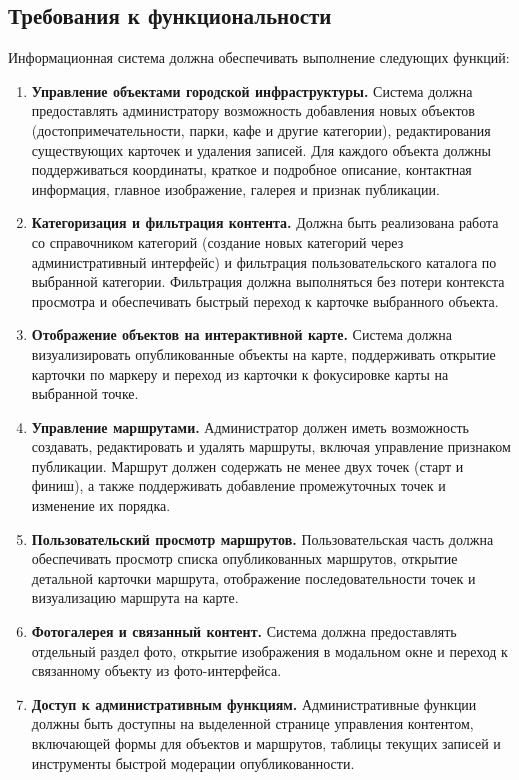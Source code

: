 \subsection{Требования к функциональности}
Информационная система должна обеспечивать выполнение следующих функций:
\begin{enumerate}
	\item \textbf{Управление объектами городской инфраструктуры.}
	Система должна предоставлять администратору возможность добавления новых объектов (достопримечательности, парки, кафе и другие категории), редактирования существующих карточек и удаления записей. Для каждого объекта должны поддерживаться координаты, краткое и подробное описание, контактная информация, главное изображение, галерея и признак публикации.
	
	\item \textbf{Категоризация и фильтрация контента.}
	Должна быть реализована работа со справочником категорий (создание новых категорий через административный интерфейс) и фильтрация пользовательского каталога по выбранной категории. Фильтрация должна выполняться без потери контекста просмотра и обеспечивать быстрый переход к карточке выбранного объекта.
	
	\item \textbf{Отображение объектов на интерактивной карте.}
	Система должна визуализировать опубликованные объекты на карте, поддерживать открытие карточки по маркеру и переход из карточки к фокусировке карты на выбранной точке.
	
	\item \textbf{Управление маршрутами.}
	Администратор должен иметь возможность создавать, редактировать и удалять маршруты, включая управление признаком публикации. Маршрут должен содержать не менее двух точек (старт и финиш), а также поддерживать добавление промежуточных точек и изменение их порядка.
	
	\item \textbf{Пользовательский просмотр маршрутов.}
	Пользовательская часть должна обеспечивать просмотр списка опубликованных маршрутов, открытие детальной карточки маршрута, отображение последовательности точек и визуализацию маршрута на карте.
	
	\item \textbf{Фотогалерея и связанный контент.}
	Система должна предоставлять отдельный раздел фото, открытие изображения в модальном окне и переход к связанному объекту из фото-интерфейса.
	
	\item \textbf{Доступ к административным функциям.}
	Административные функции должны быть доступны на выделенной странице управления контентом, включающей формы для объектов и маршрутов, таблицы текущих записей и инструменты быстрой модерации опубликованности.
\end{enumerate}

